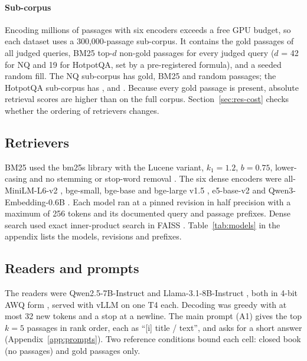\paragraph{Sub-corpus}
Encoding millions of passages with six encoders exceeds a free GPU budget, so each dataset uses a 300,000-passage sub-corpus. It contains the gold passages of all judged queries, BM25 top-$d$ non-gold passages for every judged query ($d$ = 42 for NQ and 19 for HotpotQA, set by a pre-registered formula), and a seeded random fill. The NQ sub-corpus has  gold,  BM25 and  random passages; the HotpotQA sub-corpus has ,  and . Because every gold passage is present, absolute retrieval scores are higher than on the full corpus. Section~\ref{sec:res-cost} checks whether the ordering of retrievers changes.

\subsection{Retrievers}\label{sec:retrievers}
BM25 used the bm25s library \citep{lu2024bm25s} with the Lucene variant, $k_1=1.2$, $b=0.75$, lower-casing and no stemming or stop-word removal \citep{robertson2009bm25}. The six dense encoders were all-MiniLM-L6-v2 \citep{reimers2019sbert,wang2020minilm}, bge-small, bge-base and bge-large v1.5 \citep{xiao2024cpack}, e5-base-v2 \citep{wang2022e5} and Qwen3-Embedding-0.6B \citep{zhang2025qwen3emb}. Each model ran at a pinned revision in half precision with a maximum of 256 tokens and its documented query and passage prefixes. Dense search used exact inner-product search in FAISS \citep{johnson2021faiss}. Table~\ref{tab:models} in the appendix lists the models, revisions and prefixes.

\subsection{Readers and prompts}\label{sec:readers}
The readers were Qwen2.5-7B-Instruct \citep{qwen2025qwen25} and Llama-3.1-8B-Instruct \citep{grattafiori2024llama3}, both in 4-bit AWQ form \citep{lin2024awq}, served with vLLM \citep{kwon2023vllm} on one T4 each. Decoding was greedy with at most 32 new tokens and a stop at a newline. The main prompt (A1) gives the top $k=5$ passages in rank order, each as ``[i] title / text'', and asks for a short answer (Appendix~\ref{app:prompts}). Two reference conditions bound each cell: closed book (no passages) and gold passages only.

